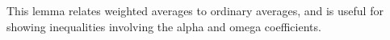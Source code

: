 \documentclass{article}
\makeatletter
\theoremstyle{plain}
\theoremstyle{plain}
\newtheorem{lem}{\protect\lemmaname}
\theoremstyle{definition}
\theoremstyle{remark}
\theoremstyle{definition}
\theoremstyle{plain}
\theoremstyle{plain}
\theoremstyle{definition}
\newenvironment{proof}[1][\protect\proofname]{\par
	\normalfont\topsep6\p@\@plus6\p@\relax
	\trivlist
	\itemindent\parindent
	\item[\hskip\labelsep\scshape #1]\ignorespaces
}{%
	\endtrivlist\@endpefalse
}
\providecommand{\proofname}{Proof}
\providecommand{\lemmaname}{Lemma}
\makeatother
\begin{document}
This lemma relates weighted averages to ordinary averages, and is useful for showing inequalities involving the alpha and omega coefficients.



\end{document}
